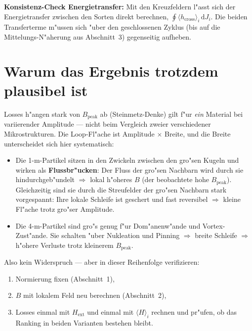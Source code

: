 \documentclass[11pt,a4paper]{article}
\begin{document}
\textbf{Konsistenz-Check Energietransfer:} Mit den Kreuzfeldern l"asst sich der Energietransfer zwischen den Sorten direkt berechnen, $\oint \langle h_\text{cross}\rangle_i \,\mathrm{d}J_i$. Die beiden Transferterme m"ussen sich "uber den geschlossenen Zyklus (bis auf die Mittelungs-N"aherung aus Abschnitt~3) gegenseitig aufheben.

\section{Warum das Ergebnis trotzdem plausibel ist}

\glqq Losses h"angen stark von $B_\mathrm{peak}$ ab\grqq{} (Steinmetz-Denke) gilt f"ur \emph{ein} Material bei variierender Amplitude --- nicht beim Vergleich zweier verschiedener Mikrostrukturen. Die Loop-Fl"ache ist Amplitude $\times$ Breite, und die Breite unterscheidet sich hier systematisch:

\begin{itemize}
  \item Die 1-\textmu m-Partikel sitzen in den Zwickeln zwischen den gro"sen Kugeln und wirken als \textbf{Flussbr"ucken}: Der Fluss der gro"sen Nachbarn wird durch sie hindurchgeb"undelt $\Rightarrow$ lokal h"oheres $B$ (der beobachtete hohe $B_\mathrm{peak}$). Gleichzeitig sind sie durch die Streufelder der gro"sen Nachbarn stark vorgespannt: Ihre lokale Schleife ist geschert und fast reversibel $\Rightarrow$ kleine Fl"ache trotz gro"ser Amplitude.
  \item Die 4-\textmu m-Partikel sind gro"s genug f"ur Dom"anenw"ande und Vortex-Zust"ande. Sie schalten "uber Nukleation und Pinning $\Rightarrow$ breite Schleife $\Rightarrow$ h"ohere Verluste trotz kleinerem $B_\mathrm{peak}$.
\end{itemize}

Also kein Widerspruch --- aber in dieser Reihenfolge verifizieren:
\begin{enumerate}
  \item Normierung fixen (Abschnitt~1),
  \item $B$ mit lokalem Feld neu berechnen (Abschnitt~2),
  \item Losses einmal mit $H_\text{ext}$ und einmal mit $\langle H \rangle_i$ rechnen und pr"ufen, ob das Ranking in beiden Varianten bestehen bleibt.
\end{enumerate}
\end{document}
